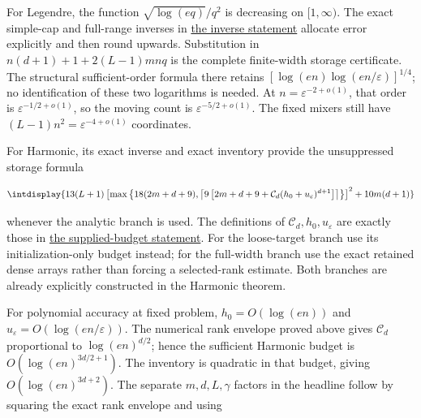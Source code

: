 
For Legendre, the function \(\sqrt{\log(eq)}/q^2\) is decreasing on \([1,\allowbreak \infty)\). The exact simple-cap and full-range inverses in \hyperref[int:legendre-inverse-certificates]{the inverse statement} allocate error explicitly and then round upwards. Substitution in \(n(d+1)+1+2(L-1)mnq\) is the complete finite-width storage certificate. The structural sufficient-order formula there retains \([\log(en)\log(en/\varepsilon)]^{1/4}\); no identification of these two logarithms is needed. At \(n=\varepsilon^{-2+o(1)}\), that order is \(\varepsilon^{-1/2+o(1)}\), so the moving count is \(\varepsilon^{-5/2+o(1)}\). The fixed mixers still have \((L-1)n^2=\varepsilon^{-4+o(1)}\) coordinates.



For Harmonic, its exact inverse and exact inventory provide the unsuppressed storage formula


\begingroup\renewcommand{\theHequation}{intdisplay.826}
\begin{equation}
\intdisplay{
13(L+1)
\left[
\max\left\{18(2m+d+9),
\left\lceil9\left[2m+d+9+
\mathcal C_d(h_0+u_\varepsilon)^{d+1}\right]\right\rceil
\right\}\right]^2+10m(d+1)
}
\label{int:eq-0403-corollary-exact-harmonic-storage}
\end{equation}
\endgroup


whenever the analytic branch is used. The definitions of \(\mathcal C_d,\allowbreak h_0,\allowbreak u_\varepsilon\) are exactly those in \hyperref[int:harmonic-variable-budget-theorem]{the supplied-budget statement}. For the loose-target branch use its initialization-only budget instead; for the full-width branch use the exact retained dense arrays rather than forcing a selected-rank estimate. Both branches are already explicitly constructed in the Harmonic theorem.



For polynomial accuracy at fixed problem, \(h_0=O(\log(en))\) and \(u_\varepsilon=O(\log(en/\varepsilon))\). The numerical rank envelope proved above gives \(\mathcal C_d\) proportional to \(\log(en)^{d/2}\); hence the sufficient Harmonic budget is \(O(\log(en)^{3d/2+1})\). The inventory is quadratic in that budget, giving \(O(\log(en)^{3d+2})\). The separate \(m,\allowbreak d,\allowbreak L,\allowbreak \gamma\) factors in the headline follow by squaring the exact rank envelope and using


